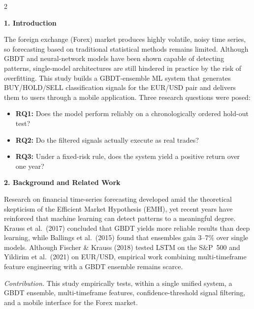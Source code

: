 \vspace{1mm}
\setcounter{table}{0}
\setcounter{figure}{0}
\renewcommand{\thetable}{\arabic{table}}
\renewcommand{\thefigure}{\arabic{figure}}
\setlength{\columnsep}{7mm}
\begin{multicols*}{2}
\setlength{\parskip}{4pt}
\setlength{\intextsep}{4pt}
\setlength{\textfloatsep}{4pt}
\setlength{\abovecaptionskip}{2pt}
\setlength{\belowcaptionskip}{2pt}
\sloppy

\noindent\textbf{1. Introduction}

The foreign exchange (Forex) market produces highly volatile, noisy time series, so forecasting based on traditional statistical methods remains limited. Although GBDT and neural-network models have been shown capable of detecting patterns, single-model architectures are still hindered in practice by the risk of overfitting. This study builds a GBDT-ensemble ML system that generates BUY/HOLD/SELL classification signals for the EUR/USD pair and delivers them to users through a mobile application. Three research questions were posed:
\begin{itemize}\setlength\itemsep{0pt}\small
    \item \textbf{RQ1:} Does the model perform reliably on a chronologically ordered hold-out test?
    \item \textbf{RQ2:} Do the filtered signals actually execute as real trades?
    \item \textbf{RQ3:} Under a fixed-risk rule, does the system yield a positive return over one year?
\end{itemize}

\noindent\textbf{2. Background and Related Work}

Research on financial time-series forecasting developed amid the theoretical skepticism of the Efficient Market Hypothesis (EMH), yet recent years have reinforced that machine learning can detect patterns to a meaningful degree. Krauss et al.\ (2017) concluded that GBDT yields more reliable results than deep learning, while Ballings et al.\ (2015) found that ensembles gain 3--7\% over single models. Although Fischer \& Krauss (2018) tested LSTM on the S\&P~500 and Yildirim et al.\ (2021) on EUR/USD, empirical work combining multi-timeframe feature engineering with a GBDT ensemble remains scarce.

\emph{Contribution.} This study empirically tests, within a single unified system, a GBDT ensemble, multi-timeframe features, confidence-threshold signal filtering, and a mobile interface for the Forex market.


\end{multicols*}
